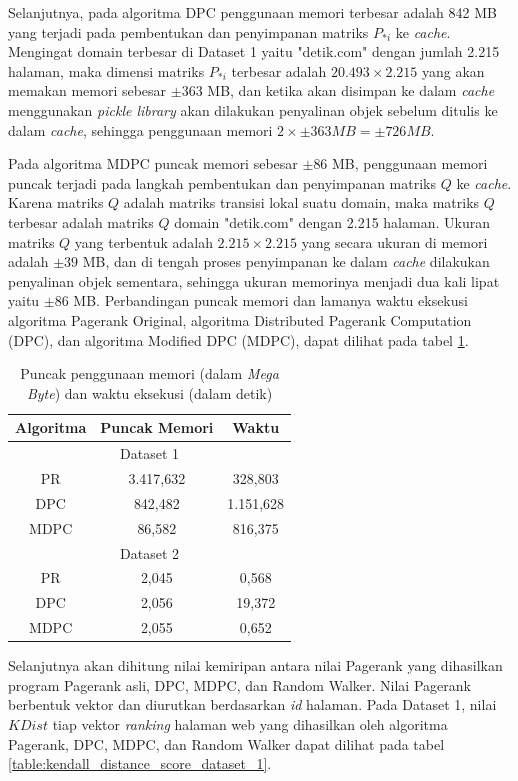 \documentclass[
	a4paper, %
	12pt, %
	unnumberedsections, %
	twoside, %
]{LTJournalArticle}
\begin{document}
Selanjutnya, pada algoritma DPC penggunaan memori terbesar adalah 842 MB yang terjadi pada pembentukan dan penyimpanan matriks $P_{*i}$ ke \textit{cache}. Mengingat domain terbesar di Dataset 1 yaitu "detik.com" dengan jumlah 2.215 halaman, maka dimensi matriks $P_{*i}$ terbesar adalah $20.493 \times 2.215$ yang akan memakan memori sebesar $\pm363$ MB, dan ketika akan disimpan ke dalam \textit{cache} menggunakan \textit{pickle library} akan dilakukan penyalinan objek sebelum ditulis ke dalam \textit{cache}, sehingga penggunaan memori $2 \times \pm363 MB = \pm726 MB$. 

Pada algoritma MDPC puncak memori sebesar $\pm86$ MB, penggunaan memori puncak terjadi pada langkah pembentukan dan penyimpanan matriks $Q$ ke \textit{cache}. Karena matriks $Q$ adalah matriks transisi lokal suatu domain, maka matriks $Q$ terbesar adalah matriks $Q$ domain "detik.com" dengan 2.215 halaman. Ukuran matriks $Q$ yang terbentuk adalah $2.215 \times 2.215$ yang secara ukuran di memori adalah $\pm39$ MB, dan di tengah proses penyimpanan ke dalam \textit{cache} dilakukan penyalinan objek sementara, sehingga ukuran memorinya menjadi dua kali lipat yaitu $\pm86$ MB. Perbandingan puncak memori dan lamanya waktu eksekusi algoritma Pagerank Original, algoritma Distributed Pagerank Computation (DPC), dan algoritma Modified DPC (MDPC), dapat dilihat pada tabel \ref{table:algorithm_performance}.

\begin{table}
	\caption{Puncak penggunaan memori (dalam \textit{Mega Byte}) dan waktu eksekusi (dalam detik)}
	\label{table:algorithm_performance}
	\begin{tabular}{|c|c|c|}
		\hline
		\textbf{Algoritma} & \textbf{Puncak Memori} & \textbf{Waktu} \\
		\hline
		\multicolumn{3}{|c|}{Dataset 1} \\
		\hline
		PR & 3.417,632 & 328,803 \\
		DPC & 842,482 & 1.151,628 \\
		MDPC & 86,582 & 816,375 \\
		\hline
		\multicolumn{3}{|c|}{Dataset 2} \\
		\hline
		PR & 2,045 & 0,568 \\
		DPC & 2,056 & 19,372 \\
		MDPC & 2,055 & 0,652 \\
		\hline
	\end{tabular}
\end{table}

Selanjutnya akan dihitung nilai kemiripan antara nilai Pagerank yang dihasilkan program Pagerank asli, DPC, MDPC, dan Random Walker. Nilai Pagerank berbentuk vektor dan diurutkan berdasarkan \textit{id} halaman. Pada Dataset 1, nilai $KDist$ tiap vektor \textit{ranking} halaman web yang dihasilkan oleh algoritma Pagerank, DPC, MDPC, dan Random Walker dapat dilihat pada tabel \ref{table:kendall_distance_score_dataset_1}. 
\end{document}
